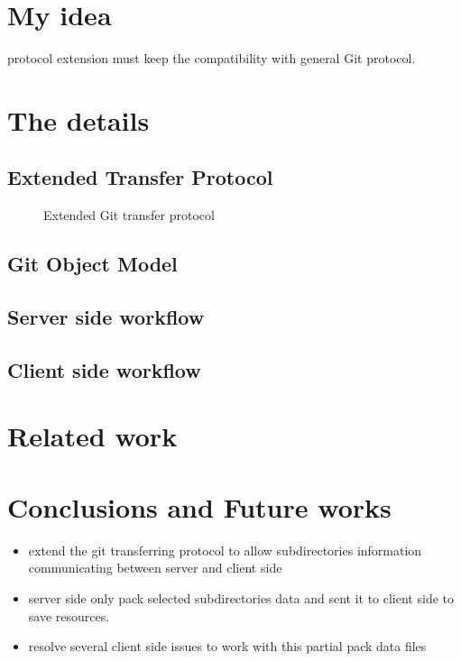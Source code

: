 \documentclass[preprint]{sigplanconf}
\begin{document}
\section{My idea}
protocol extension must keep the compatibility with general Git protocol.


\section{The details}

\subsection{Extended Transfer Protocol}
\begin{figure}
  \centering
  
  \caption{Extended Git transfer protocol}
  \label{fig:git-proto-ext-seq}
\end{figure}
\subsection{Git Object Model}
\subsection{Server side workflow}
\subsection{Client side workflow}

\section{Related work}

\section{Conclusions and Future works}


\begin{itemize}
  \item  extend the git transferring protocol to allow subdirectories information communicating between server and client side
  \item server side only pack selected subdirectories data and sent it to client side to save resources.
  \item resolve several client side issues to work with this partial pack data files
\end{itemize}
\end{document}
